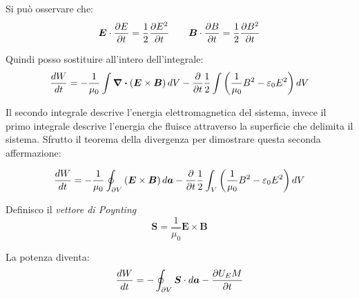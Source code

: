 \documentclass[a4paper]{scrarticle}
\begin{document}
Si può osservare che:
\begin{equation*}
    \bm E \cdot \pdv{E}{t} = \frac{1}{2} \pdv{E^2}{t} \qquad
    \bm B \cdot \pdv{B}{t} = \frac{1}{2} \pdv{B^2}{t}
\end{equation*}

Quindi posso sostituire all'intero dell'integrale:
\begin{equation*}
    \frac{dW}{dt} = -\frac{1}{\mu_0}\int \div{\left(\bm E \times \bm B\right)} dV - \pdv{t}\frac{1}{2}\int\left(\frac{1}{\mu_0}B^2- \varepsilon_0 {E^2}\right) dV
\end{equation*}

Il secondo integrale descrive l'energia elettromagnetica del sistema, invece il primo integrale descrive l'energia che fluisce attraverso la superficie che delimita il sistema.
Sfrutto il teorema della divergenza per dimostrare questa seconda affermazione:

\begin{equation*}
    \frac{dW}{dt} = -\frac{1}{\mu_0}\oint_{\partial V} \left(\bm E \times \bm B\right) d\bm a - \pdv{t}\frac{1}{2}\int_V \left(\frac{1}{\mu_0}B^2- \varepsilon_0 {E^2}\right) dV
\end{equation*}

Definisco il \emph{vettore di Poynting}
\begin{equation}
    \bm S = \frac{1}{\mu_0} \bm E \times \bm B
\end{equation}

La potenza diventa:
\begin{equation}
    \frac{dW}{dt}= - \oint_{\partial V} \bm S \cdot d \bm a - \pdv{U_EM}{t}
\end{equation}
\end{document}
